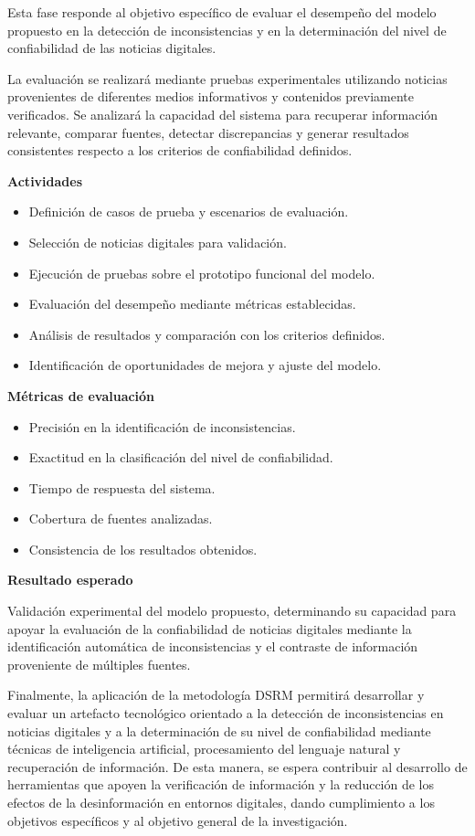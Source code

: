\documentclass[12pt]{article}
\begin{document}
Esta fase responde al objetivo específico de evaluar el desempeño del modelo propuesto en la detección de inconsistencias y en la determinación del nivel de confiabilidad de las noticias digitales.

La evaluación se realizará mediante pruebas experimentales utilizando noticias provenientes de diferentes medios informativos y contenidos previamente verificados. Se analizará la capacidad del sistema para recuperar información relevante, comparar fuentes, detectar discrepancias y generar resultados consistentes respecto a los criterios de confiabilidad definidos.

\textbf{Actividades}

\begin{itemize}
    \item Definición de casos de prueba y escenarios de evaluación.
    \item Selección de noticias digitales para validación.
    \item Ejecución de pruebas sobre el prototipo funcional del modelo.
    \item Evaluación del desempeño mediante métricas establecidas.
    \item Análisis de resultados y comparación con los criterios definidos.
    \item Identificación de oportunidades de mejora y ajuste del modelo.
\end{itemize}

\textbf{Métricas de evaluación}

\begin{itemize}
    \item Precisión en la identificación de inconsistencias.
    \item Exactitud en la clasificación del nivel de confiabilidad.
    \item Tiempo de respuesta del sistema.
    \item Cobertura de fuentes analizadas.
    \item Consistencia de los resultados obtenidos.
\end{itemize}

\textbf{Resultado esperado}

Validación experimental del modelo propuesto, determinando su capacidad para apoyar la evaluación de la confiabilidad de noticias digitales mediante la identificación automática de inconsistencias y el contraste de información proveniente de múltiples fuentes.

Finalmente, la aplicación de la metodología DSRM permitirá desarrollar y evaluar un artefacto tecnológico orientado a la detección de inconsistencias en noticias digitales y a la determinación de su nivel de confiabilidad mediante técnicas de inteligencia artificial, procesamiento del lenguaje natural y recuperación de información. De esta manera, se espera contribuir al desarrollo de herramientas que apoyen la verificación de información y la reducción de los efectos de la desinformación en entornos digitales, dando cumplimiento a los objetivos específicos y al objetivo general de la investigación.

\vspace{1cm}

\nocite{peffers2007dsrm}



\end{document}
